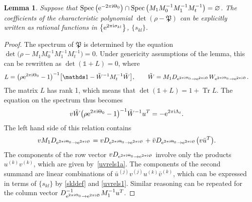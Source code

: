 \documentclass[pdftex]{sigma}
\numberwithin{equation}{section}
\newtheorem{Lemma}[Theorem]{Lemma}
\begin{document}
\begin{Lemma}Suppose that $\operatorname{Spec}\big({\rm e}^{-2\pi{\rm i} \Theta_0}\big)\cap \operatorname{Spec}\big( M_1 M_0^{-1}M_1^{-1}M_t^{-1}\big)=\varnothing $. The coefficients of the characteristic polynomial $\det (\rho-\mathfrak P)$ can be explicitly written as rational functions in $\big\{{\rm e}^{2\pi{\rm i} \sigma_{kl}}\big\}$, $ \{s_{kl} \}$.
\end{Lemma}
\begin{proof} The spectrum of $\mathfrak P$ is determined by the equation $\det \big(\rho-M_1 M_0^{-1}M_1^{-1}M_t^{-1}\big)=0 $. Under genericity assumptions of the lemma, this can be rewritten as $\det (\mathds 1+L)=0$, where
\begin{gather*}
L=\big(\rho {\rm e}^{2\pi{\rm i} \Theta_0}-1\big)^{-1}\big[ \mathds 1-\tilde W^{-1}M_t^{-1}\tilde W\big],\qquad \tilde W=M_1 D_{{\rm e}^{2\pi{\rm i}\Theta_0}\to {\rm e}^{2\pi{\rm i} \mathfrak S}}W_{{\rm e}^{2\pi{\rm i}\Theta_0}\to {\rm e}^{2\pi{\rm i} \mathfrak S}}.
\end{gather*}
The matrix $L$ has rank 1, which means that $\det (\mathds 1+L)=1+\operatorname{Tr} L$. The equation on the spectrum thus becomes
\begin{gather*}
v\tilde W \big(\rho {\rm e}^{2\pi{\rm i} \Theta_0}-1\big)^{-1} \tilde W^{-1} u^T =-{\rm e}^{2\pi{\rm i} \Lambda_t}.
\end{gather*}
The left hand side of this relation contains
\begin{gather*} vM_1 D_{{\rm e}^{2\pi{\rm i}\Theta_0}\to {\rm e}^{2\pi{\rm i} \mathfrak S}}=v D_{{\rm e}^{2\pi{\rm i}\Theta_0}\to {\rm e}^{2\pi{\rm i} \mathfrak S}} +
\bar v D_{{\rm e}^{2\pi{\rm i}\Theta_0}\to {\rm e}^{2\pi{\rm i} \mathfrak S}} \big(v\bar u^T\big) .\end{gather*}
 The components of the row vector $v D_{{\rm e}^{2\pi{\rm i}\Theta_0}\to {\rm e}^{2\pi{\rm i} \mathfrak S}}$ involve only the products $u^{(k)}v^{(k)}$, which are given by~\eqref{uvrels1a}. The components of the second summand are linear combinations of
$\bar u^{(j)} v^{(j)}u^{(k)}\bar v^{(k)}$, which can be expressed in terms of $\{s_{kl}\}$ by \eqref{skldef} and \eqref{uvrels1}. Similar reasoning can be repeated for
the column vector $ D_{{\rm e}^{2\pi{\rm i}\Theta_0}\to {\rm e}^{2\pi{\rm i} \mathfrak S}} ^{-1}M_1^{-1}u^T$. \end{proof}
\end{document}
